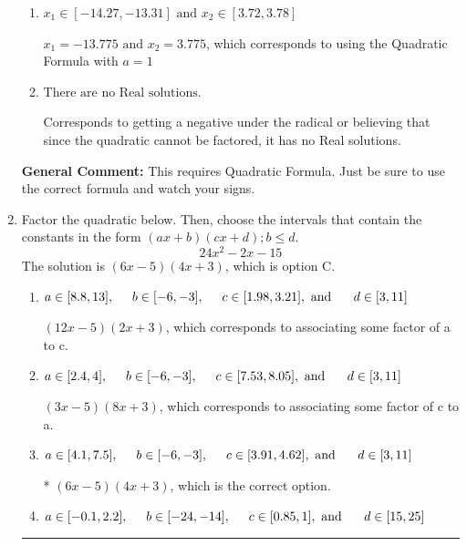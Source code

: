 \documentclass{extbook}[14pt]
\newcommand{\litem}[1]{\item #1

\rule{\textwidth}{0.4pt}}
\begin{document}
\begin{enumerate}
{\begin{enumerate}[label=\Alph*.]
 $x_1 = -17.935 \text{ and } x_2 = 17.165$, which corresponds to writing the Quadratic Formula as $-\frac{b}{2a} \pm \sqrt{b^2 - 4ac}$.
\item \( x_1 \in [-14.27, -13.31] \text{ and } x_2 \in [3.72, 3.78] \)

 $x_1 = -13.775 \text{ and } x_2 = 3.775$, which corresponds to using the Quadratic Formula with $a=1$
\item \( \text{There are no Real solutions.} \)

Corresponds to getting a negative under the radical or believing that since the quadratic cannot be factored, it has no Real solutions.
\end{enumerate}

\textbf{General Comment:} This requires Quadratic Formula. Just be sure to use the correct formula and watch your signs.
}
\litem{
Factor the quadratic below. Then, choose the intervals that contain the constants in the form $(ax+b)(cx+d); b \leq d.$
\[ 24x^{2} -2 x -15 \]The solution is \( (6x -5)(4x + 3) \), which is option C.\begin{enumerate}[label=\Alph*.]
\item \( a \in [8.8, 13], \hspace*{5mm} b \in [-6, -3], \hspace*{5mm} c \in [1.98, 3.21], \text{ and } \hspace*{5mm} d \in [3, 11] \)

 $(12x -5)(2x + 3)$, which corresponds to associating some factor of a to c.
\item \( a \in [2.4, 4], \hspace*{5mm} b \in [-6, -3], \hspace*{5mm} c \in [7.53, 8.05], \text{ and } \hspace*{5mm} d \in [3, 11] \)

 $(3x -5)(8x + 3)$, which corresponds to associating some factor of c to a.
\item \( a \in [4.1, 7.5], \hspace*{5mm} b \in [-6, -3], \hspace*{5mm} c \in [3.91, 4.62], \text{ and } \hspace*{5mm} d \in [3, 11] \)

* $(6x -5)(4x + 3)$, which is the correct option.
\item \( a \in [-0.1, 2.2], \hspace*{5mm} b \in [-24, -14], \hspace*{5mm} c \in [0.85, 1], \text{ and } \hspace*{5mm} d \in [15, 25] \)


\end{enumerate}}
\end{enumerate}
\end{document}
